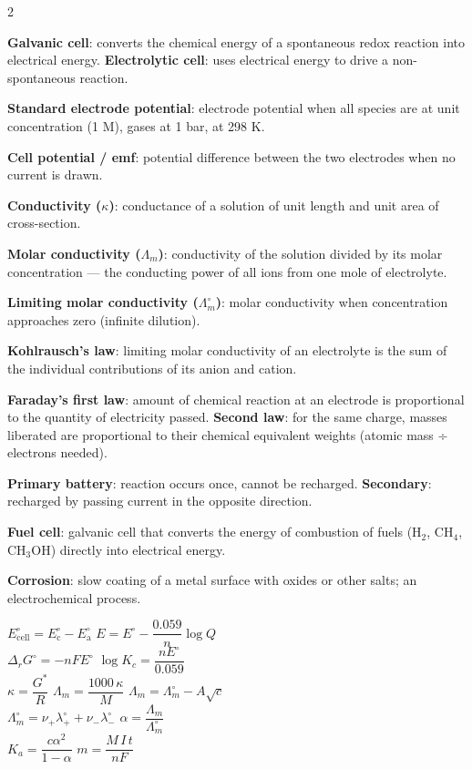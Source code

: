 \documentclass[10pt,a4paper]{extarticle}
\begin{document}
\begin{multicols}{2}
\begin{fl}
\item \textbf{Galvanic cell}: converts the chemical energy of a spontaneous redox reaction into electrical energy. \textbf{Electrolytic cell}: uses electrical energy to drive a non-spontaneous reaction.
\item \textbf{Standard electrode potential}: electrode potential when all species are at unit concentration (1 M), gases at 1 bar, at 298 K.
\item \textbf{Cell potential / emf}: potential difference between the two electrodes when no current is drawn.
\item \textbf{Conductivity ($\kappa$)}: conductance of a solution of unit length and unit area of cross-section.
\item \textbf{Molar conductivity ($\Lambda_m$)}: conductivity of the solution divided by its molar concentration — the conducting power of all ions from one mole of electrolyte.
\item \textbf{Limiting molar conductivity ($\Lambda^\circ_m$)}: molar conductivity when concentration approaches zero (infinite dilution).
\item \textbf{Kohlrausch's law}: limiting molar conductivity of an electrolyte is the sum of the individual contributions of its anion and cation.
\item \textbf{Faraday's first law}: amount of chemical reaction at an electrode is proportional to the quantity of electricity passed. \textbf{Second law}: for the same charge, masses liberated are proportional to their chemical equivalent weights (atomic mass ÷ electrons needed).
\item \textbf{Primary battery}: reaction occurs once, cannot be recharged. \textbf{Secondary}: recharged by passing current in the opposite direction.
\item \textbf{Fuel cell}: galvanic cell that converts the energy of combustion of fuels (H$_2$, CH$_4$, CH$_3$OH) directly into electrical energy.
\item \textbf{Corrosion}: slow coating of a metal surface with oxides or other salts; an electrochemical process.
\end{fl}

\begin{kbox}
$E^\circ_\text{cell}=E^\circ_\text{c}-E^\circ_\text{a}$ \qquad $E=E^\circ-\dfrac{0.059}{n}\log Q$\\[2pt]$\Delta_rG^\circ=-nFE^\circ$ \qquad $\log K_c=\dfrac{nE^\circ}{0.059}$\\[2pt]
$\kappa=\dfrac{G^*}{R}$ \qquad $\Lambda_m=\dfrac{1000\,\kappa}{M}$ \qquad $\Lambda_m=\Lambda^\circ_m-A\sqrt c$\\[2pt]$\Lambda^\circ_m=\nu_+\lambda^\circ_++\nu_-\lambda^\circ_-$ \qquad 
$\alpha=\dfrac{\Lambda_m}{\Lambda^\circ_m}$\\[2pt]$K_a=\dfrac{c\alpha^2}{1-\alpha}$ \quad $m=\dfrac{M\,I\,t}{nF}$
\end{kbox}


\end{multicols}
\end{document}
